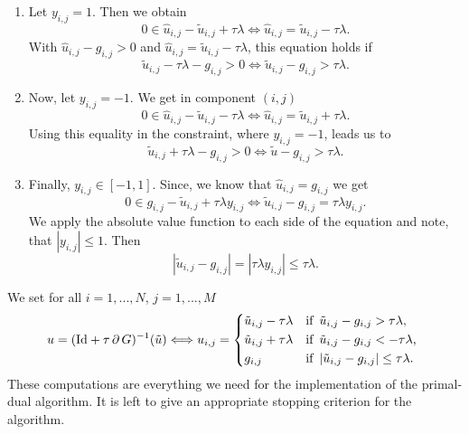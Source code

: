 \documentclass{scrreprt}
\begin{document}
                \begin{enumerate}
                    \item Let $y_{i,j} = 1$. Then we obtain
                        $$
                            0 \in \hat{u}_{i,j} - \tilde{u}_{i,j} + \tau\lambda \Longleftrightarrow \hat{u}_{i,j} = \tilde{u}_{i,j} - \tau\lambda.
                        $$
                    With $\hat{u}_{i,j} - g_{i,j} > 0$ and $\hat{u}_{i,j} = \tilde{u}_{i,j} - \tau\lambda$, this equation holds if 
                        $$
                            \tilde{u}_{i,j} - \tau\lambda - g_{i,j} > 0 \Longleftrightarrow \tilde{u}_{i,j} - g_{i,j} > \tau\lambda.
                        $$
                    \item Now, let $y_{i,j} = -1$. We get in component $(i,j)$
                        $$
                            0 \in \hat{u}_{i,j} - \tilde{u}_{i,j} - \tau\lambda \Longleftrightarrow \hat{u}_{i,j} = \tilde{u}_{i,j} + \tau\lambda.
                        $$
                    Using this equality in the constraint, where $y_{i,j} = -1$, leads us to
                        $$
                            \tilde{u}_{i,j} + \tau\lambda - g_{i,j} > 0 \Longleftrightarrow \tilde{u} - g_{i,j} > \tau\lambda.
                        $$
                    \item Finally, $y_{i,j} \in [-1, 1]$. Since, we know that $\hat{u}_{i,j} = g_{i,j}$ we get
                        $$
                            0 \in g_{i,j} - \tilde{u}_{i,j} + \tau\lambda y_{i,j} \Longleftrightarrow \tilde{u}_{i,j} - g_{i,j} = \tau\lambda y_{i,j}.
                        $$
                    We apply the absolute value function to each side of the equation and note, that $|y_{i,j}| \le 1$. Then
                        $$
                            |\tilde{u}_{i,j} - g_{i,j}| = |\tau\lambda y_{i,j}| \le \tau\lambda.
                        $$
                \end{enumerate}
            We set for all $i = 1, ..., N$, $j = 1, ..., M$
                \begin{equation}
                    u = (\textnormal{Id} + \tau\,\partial\,G)^{-1}(\tilde{u}) \Longleftrightarrow u_{i, j} = 
                        \begin{dcases*}
                            \tilde{u}_{i,j} - \tau\lambda & \textnormal{if\, $\tilde{u}_{i,j} - g_{i,j} > \tau\lambda$,} \\
                            \tilde{u}_{i,j} + \tau\lambda & \textnormal{if\, $\tilde{u}_{i,j} - g_{i,j} < - \tau\lambda$,} \\
                            g_{i, j} & \textnormal{if\, $|\tilde{u}_{i,j} - g_{i,j}| \le \tau\lambda$}.
                        \end{dcases*}
                \label{eq:prox_g_tvl1}
                \end{equation}
            These computations are everything we need for the implementation of the primal-dual algorithm. It is left to give an appropriate stopping criterion for the algorithm.
\end{document}
